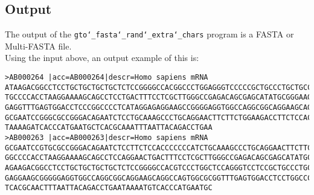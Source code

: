 \subsection*{Output}
The output of the \texttt{gto\char`_fasta\char`_rand\char`_extra\char`_chars} program is a FASTA or Multi-FASTA file.\\
Using the input above, an output example of this is:
\begin{lstlisting}
>AB000264 |acc=AB000264|descr=Homo sapiens mRNA 
ATAAGACGGCCTCCTGCTGCTGCTGCTCTCCGGGGCCACGGCCCTGGAGGGTCCCCCGCTGCCCTGCTGCCATTGTCCCC
TGCCCCACCTAAGGAAAAGCAGCCTCCTGACTTTCCTCGCTTGGGCCGAGACAGCGAGCATATGCGGGAAGCGGCAGGAA
GAGGTTTGAGTGGACCTCCCGGCCCCTCATAGGAGAGGAAGCCGGGGAGGTGGCCAGGCGGCAGGAAGCAGGCCAGTGTC
GCGAATCCGGGCGCCGGGACAGAATCTCCTGCAAAGCCCTGCAGGAACTTCTTCTGGAAGACCTTCTCCACCCCCCCTTG
TAAAAGATCACCCATGAATGCTCACGCAAATTTAATTACAGACCTGAA
>AB000263 |acc=AB000263|descr=Homo sapiens mRNA 
GCGAATCCGTGCGCCGGGACAGAATCTCCTTCTCCACCCCCCCATCTGCAAAGCCCTGCAGGAACTTCTTCTGGAAGACC
GGCCCCACCTAAGGAAAAGCAGCCTCCAGGAACTGACTTTCCTCGCTTGGGCCGAGACAGCGAGCATATGCGGGAAGCGG
AGAAGACGGCCTCCTGCTGCTGCTGCTCTCCGGGGCCACGTCCCTGGCTCCAGGGTCCTCCGCTGCCCTGCTGCCATTGC
GAGGAAGCGGGGGAGGTGGCCAGGCGGCAGGAAGCAGGCCAGTGGCGCGGTTTGAGTGGACCTCCTGGCCCCTCATAGGA
TCACGCAACTTTAATTACAGACCTGAATAAAATGTCACCCATGAATGC
\end{lstlisting}
